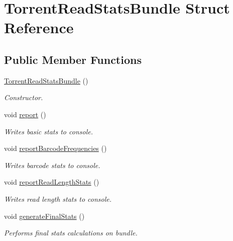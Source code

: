 \hypertarget{structTorrentReadStatsBundle}{\section{Torrent\-Read\-Stats\-Bundle Struct Reference}
\label{structTorrentReadStatsBundle}
}
\subsection*{Public Member Functions}
\begin{DoxyCompactItemize}
\item 
\hyperlink{structTorrentReadStatsBundle_aa7901fa627c555d0a9cefa3987c3f8ad}{Torrent\-Read\-Stats\-Bundle} ()
\begin{DoxyCompactList}\small\item\em Constructor. \end{DoxyCompactList}\item 
void \hyperlink{structTorrentReadStatsBundle_a02703af2b1e606a6c948ea7ff3c183cc}{report} ()
\begin{DoxyCompactList}\small\item\em Writes basic stats to console. \end{DoxyCompactList}\item 
void \hyperlink{structTorrentReadStatsBundle_a2e24c35574341702bb1367d78a73e261}{report\-Barcode\-Frequencies} ()
\begin{DoxyCompactList}\small\item\em Writes barcode stats to console. \end{DoxyCompactList}\item 
void \hyperlink{structTorrentReadStatsBundle_aff8775ddcc7faa8219ff15f92037dec8}{report\-Read\-Length\-Stats} ()
\begin{DoxyCompactList}\small\item\em Writes read length stats to console. \end{DoxyCompactList}\item 
void \hyperlink{structTorrentReadStatsBundle_ad061b13d49d2f5f942ea3961b45e5e31}{generate\-Final\-Stats} ()
\begin{DoxyCompactList}\small\item\em Performs final stats calculations on bundle. \end{DoxyCompactList}\end{DoxyCompactItemize}
